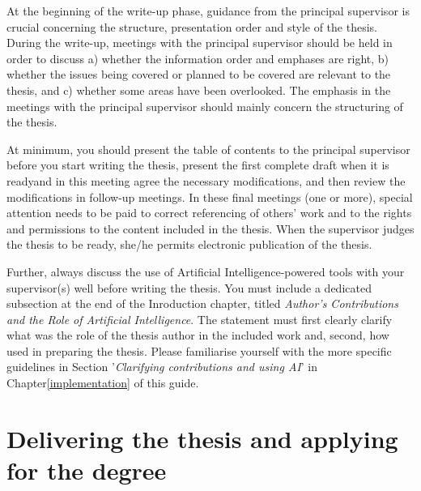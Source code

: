 At the beginning of the write-up phase, guidance from the principal supervisor is crucial concerning the structure, presentation order and style of the thesis. During the write-up, meetings with the principal supervisor should be held in order to discuss a) whether the information order and emphases are right, b) whether the issues being covered or planned to be covered are relevant to the thesis, and c) whether some areas have been overlooked. The emphasis in the meetings with the principal supervisor should mainly concern the structuring of the thesis.

At minimum, you should present the table of contents to the principal supervisor before you start writing the thesis, present the first complete draft when it is ready\DIFaddbegin \DIFadd{, }\DIFaddend and in this meeting agree the necessary modifications, and then review the modifications in follow-up meetings. In these final meetings (one or more), special attention needs to be paid to correct referencing of others’ work and to the rights and permissions to the content included in the thesis. When the supervisor judges the thesis to be ready, she/he permits electronic publication of the thesis.

Further, always discuss the use of Artificial Intelligence-powered tools with your supervisor(s) well before writing the thesis. You must include a dedicated subsection at the end of the Inroduction chapter, titled \textit{Author's Contributions and the Role of Artificial Intelligence}. The statement must first clearly clarify what was the role of the thesis author in the included work and, second, how \DIFdelbegin {}\DIFdelend \DIFaddbegin {}\DIFaddend used in preparing the thesis. Please familiarise yourself with the more specific guidelines in Section '\textit{Clarifying contributions and using AI}' in Chapter\DIFaddbegin \DIFadd{~}\DIFaddend \ref{implementation} of this guide.

\section{Delivering the thesis and applying for the degree}

